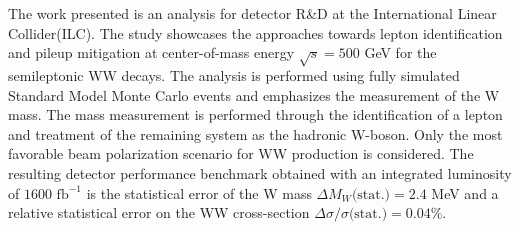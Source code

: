 %

%

The work presented is an analysis for detector R\&D at the International Linear Collider(ILC). The study showcases the approaches towards lepton identification and pileup mitigation at center-of-mass energy $\sqrt{s} = 500$ GeV for the semileptonic WW decays. The analysis is performed using fully simulated Standard Model Monte Carlo events and emphasizes the measurement of the W mass. The mass measurement is performed through the identification of a lepton and treatment of the remaining system as the hadronic W-boson. Only the most favorable beam polarization scenario for WW production is considered. The resulting detector performance benchmark obtained with an integrated luminosity of $1600 \, \, \text{fb}^{-1}$ is the statistical error of the W mass $\Delta M_W\text{(stat.)} =  2.4 $ MeV and a relative statistical error on the WW cross-section $\Delta \sigma / \sigma \text{(stat.)} = 0.04 \% $. 


